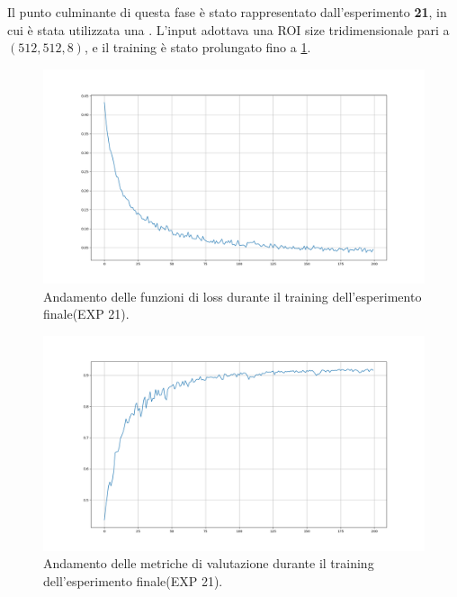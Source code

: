 Il punto culminante di questa fase è stato rappresentato dall’esperimento \textbf{21}, in cui è stata utilizzata una . L’input adottava una ROI size tridimensionale pari a $(512, 512, 8)$, e il training è stato prolungato fino a  \ref{fig:losses}. 

\begin{minipage}{.48\textwidth}
    \begin{figure}[H] 
        \centering 
        \includegraphics[width=\textwidth]{figures/losses.png} 
        \caption{Andamento delle funzioni di loss durante il training dell’esperimento finale(EXP 21).}
        \label{fig:losses}
    \end{figure} 
\end{minipage}
\hfill
\begin{minipage}{.48\textwidth}
    \begin{figure}[H] 
        \centering 
        \includegraphics[width=\textwidth]{figures/metrics.png} 
        \caption{Andamento delle metriche di valutazione durante il training dell’esperimento finale(EXP 21).}
        \label{fig:metrics}
    \end{figure} 
\end{minipage}




